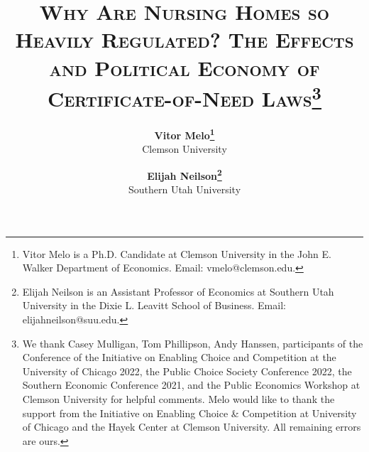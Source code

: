 \documentclass[12pt]{article}
\begin{document}

\title{\textsc{Why Are Nursing Homes so Heavily Regulated? The Effects and Political Economy of Certificate-of-Need Laws}\thanks{We thank Casey Mulligan, Tom Phillipson, Andy Hanssen, participants of the Conference of the Initiative on Enabling Choice and Competition at the University of Chicago 2022, the Public Choice Society Conference 2022, the Southern Economic Conference 2021, and the Public Economics Workshop at Clemson University for helpful comments. Melo would like to thank the support from the Initiative on Enabling Choice \& Competition at University of Chicago and the Hayek Center at Clemson University. All remaining errors are ours.}\\
	$~$\\}

\medskip

\author{\textbf{Vitor Melo\protect\thanks{Vitor Melo is a Ph.D. Candidate at Clemson University in the John E. Walker Department of Economics. Email: vmelo@clemson.edu.}} \\ Clemson University
\and
\textbf{Elijah Neilson\protect\thanks{Elijah Neilson is an Assistant Professor of Economics at Southern Utah University in the Dixie L. Leavitt School of Business. Email: elijahneilson@suu.edu.}} \\ Southern Utah University
  	}		

\date{}              %





\renewcommand{\thefootnote}{\fnsymbol{footnote}}

\singlespacing

\maketitle
\end{document}
